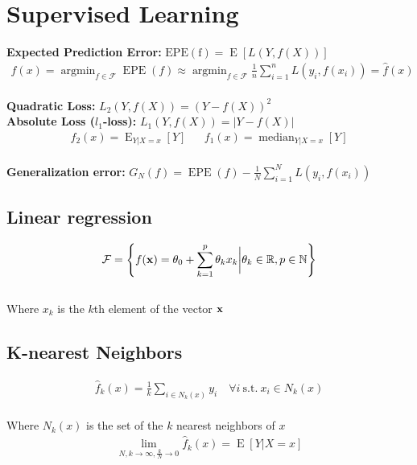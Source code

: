 \section{Supervised Learning}
%
\begin{mdframed}[style=eqbox]
\textbf{Expected Prediction Error:} $\operatorname{EPE(f)} = \operatorname E \left[ L(Y,f(X)) \right]$
\vspace*{-8pt}\begin{align*}
  f(x) = \operatorname{argmin}_{f \in \mathcal F} \operatorname{EPE}(f) \approx \operatorname{argmin}_{f \in \mathcal F} \frac{1}{n} \sum_{i=1}^{n} L(y_i, f(x_i)) = \hat{f}(x)
\end{align*}\vspace*{-10pt}\\
\textbf{Quadratic Loss:} $L_2(Y,f(X)) = (Y-f(X))^2$\\
\textbf{Absolute Loss ($l_1$-loss):} $L_1(Y,f(X)) = \vert Y-f(X) \vert$
\vspace*{-4pt}\begin{align*}
  f_2(x) = \operatorname E_{Y \vert X = x}[Y] && f_1(x) = \operatorname{median}_{Y \vert X = x}[Y]
\end{align*}\vspace*{-12pt}\\
\textbf{Generalization error:} $G_N(f) = \operatorname{EPE}(f) - \frac{1}{N} \sum_{i=1}^{N} L(y_i, f(x_i))$
\end{mdframed}
%
\begin{mdframed}[style=eqbox]
\subsection{Linear regression}
\vspace*{-6pt}\begin{align*}
\mathcal{F} = \left\{f(\mathbf{x}) = \theta_0 + \sum_{k = 1}^p \theta_k x_k \biggr\vert \theta_k \in \mathbb R, p \in \mathbb{N}\right\}
\end{align*}\vspace*{-10pt}\\
\small{Where $x_k$ is the $k$th element of the vector $\mathbf{x}$}
\end{mdframed}
%
\begin{mdframed}[style=eqbox]
\subsection{K-nearest Neighbors}
\vspace*{-6pt}\begin{align*}
\hat{f}_k(x) = \frac{1}{k} \sum_{i \in N_k(x)} y_i \quad \forall i \mathrm{~s.t.~} x_i \in N_k(x)
\end{align*}\vspace*{-10pt}\\
\small{Where $N_k(x)$ is the set of the $k$ nearest neighbors of $x$}
\vspace*{-4pt}\begin{align*}
\lim_{N,k \to \infty, \frac{k}{N} \to 0} \hat{f}_k(x) = \operatorname E[Y \vert X = x]
\end{align*}
\end{mdframed}\newpage
